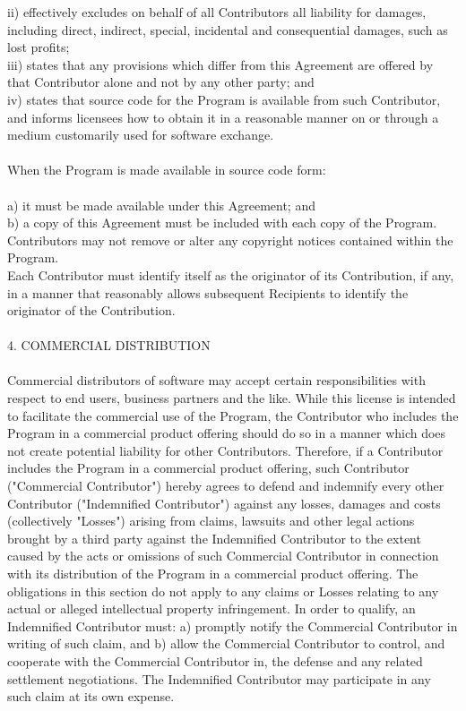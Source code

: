 \documentclass[a4paper, 12pt]{book}
\begin{document}
ii) effectively excludes on behalf of all Contributors all liability for damages, including direct, indirect, special, incidental and consequential damages, such as lost profits;\\
iii) states that any provisions which differ from this Agreement are offered by that Contributor alone and not by any other party; and\\
iv) states that source code for the Program is available from such Contributor, and informs licensees how to obtain it in a reasonable manner on or through a medium customarily used for software exchange.\\
\\
When the Program is made available in source code form:\\
\\
a) it must be made available under this Agreement; and\\
b) a copy of this Agreement must be included with each copy of the Program.\\
Contributors may not remove or alter any copyright notices contained within the Program.\\
Each Contributor must identify itself as the originator of its Contribution, if any, in a manner that reasonably allows subsequent Recipients to identify the originator of the Contribution.\\
\\
4. COMMERCIAL DISTRIBUTION\\
\\
Commercial distributors of software may accept certain responsibilities with respect to end users, business partners and the like. While this license is intended to facilitate the commercial use of the Program, the Contributor who includes the Program in a commercial product offering should do so in a manner which does not create potential liability for other Contributors. Therefore, if a Contributor includes the Program in a commercial product offering, such Contributor ("Commercial Contributor") hereby agrees to defend and indemnify every other Contributor ("Indemnified Contributor") against any losses, damages and costs (collectively "Losses") arising from claims, lawsuits and other legal actions brought by a third party against the Indemnified Contributor to the extent caused by the acts or omissions of such Commercial Contributor in connection with its distribution of the Program in a commercial product offering. The obligations in this section do not apply to any claims or Losses relating to any actual or alleged intellectual property infringement. In order to qualify, an Indemnified Contributor must: a) promptly notify the Commercial Contributor in writing of such claim, and b) allow the Commercial Contributor to control, and cooperate with the Commercial Contributor in, the defense and any related settlement negotiations. The Indemnified Contributor may participate in any such claim at its own expense.\\
\end{document}
